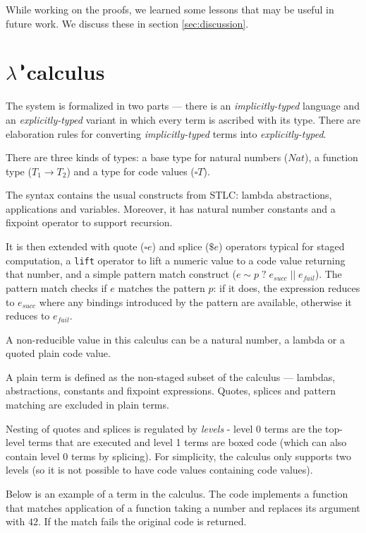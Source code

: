 \documentclass[runningheads]{article}
\newcommand{\calculus}{$\lambda^{\RIGHTcircle}$}
\begin{document}
While working on the proofs, we learned some lessons that may be useful in future work. We discuss these in section \ref{sec:discussion}.

\section{\calculus calculus}
\label{sec:calculus}

The system is formalized in two parts --- there is an \textit{implicitly-typed} language and an \textit{explicitly-typed} variant in which every term is ascribed with its type. There are elaboration rules for converting \textit{implicitly-typed} terms into \textit{explicitly-typed}.

There are three kinds of types: a base type for natural numbers ($Nat$), a function type ($T_1 \to T_2$) and a type for code values ($\square T$).

The syntax contains the usual constructs from STLC: lambda abstractions, applications and variables. Moreover, it has natural number constants and a fixpoint operator to support recursion.

It is then extended with quote ($\square e$) and splice ($\$e$) operators typical for staged computation, a \verb|lift| operator to lift a numeric value to a code value returning that number, and a simple pattern match construct ($e \sim p \; ? \; e_{succ} \; || \; e_{fail}$).
The pattern match checks if $e$ matches the pattern $p$: if it does, the expression reduces to $e_{succ}$ where any bindings introduced by the pattern are available, otherwise it reduces to $e_{fail}$.

A non-reducible value in this calculus can be a natural number, a lambda or a quoted plain code value. 

A plain term is defined as the non-staged subset of the calculus --- lambdas, abstractions, constants and fixpoint expressions. Quotes, splices and pattern matching are excluded in plain terms.

Nesting of quotes and splices is regulated by \textit{levels} - level 0 terms are the top-level terms that are executed and level 1 terms are boxed code (which can also contain level 0 terms by splicing). For simplicity, the calculus only supports two levels (so it is not possible to have code values containing code values).

Below is an example of a term in the calculus. The code implements a function that matches application of a function taking a number and replaces its argument with $42$. If the match fails the original code is returned.
\end{document}
